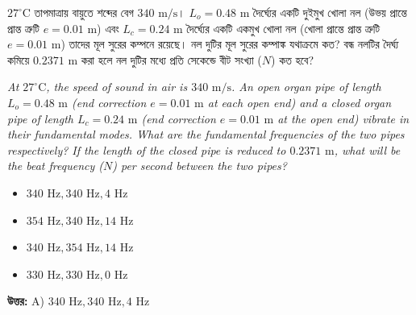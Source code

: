 \documentclass[12pt, a4paper]{article}
\begin{document}
\begin{tcolorbox}[questionbox={প্রশ্ন (Question) 23}]
    \noindent
    $27^\circ\text{C}$ তাপমাত্রায় বায়ুতে শব্দের বেগ $340\text{ m/s}$। $L_o = 0.48\text{ m}$ দৈর্ঘ্যের একটি দুইমুখ খোলা নল (উভয় প্রান্তে প্রান্ত ত্রুটি $e = 0.01\text{ m}$) এবং $L_c = 0.24\text{ m}$ দৈর্ঘ্যের একটি একমুখ খোলা নল (খোলা প্রান্তে প্রান্ত ত্রুটি $e = 0.01\text{ m}$) তাদের মূল সুরের কম্পনে রয়েছে। নল দুটির মূল সুরের কম্পাঙ্ক যথাক্রমে কত? বন্ধ নলটির দৈর্ঘ্য কমিয়ে $0.2371\text{ m}$ করা হলে নল দুটির মধ্যে প্রতি সেকেন্ডে বীট সংখ্যা ($N$) কত হবে?
    
    \vspace{0.8em}
    \begin{english}
    \noindent\textit{\color{darkgray}
    At $27^\circ\text{C}$, the speed of sound in air is $340\text{ m/s}$. An open organ pipe of length $L_o = 0.48\text{ m}$ (end correction $e = 0.01\text{ m}$ at each open end) and a closed organ pipe of length $L_c = 0.24\text{ m}$ (end correction $e = 0.01\text{ m}$ at the open end) vibrate in their fundamental modes. What are the fundamental frequencies of the two pipes respectively? If the length of the closed pipe is reduced to $0.2371\text{ m}$, what will be the beat frequency ($N$) per second between the two pipes?
    }
    \end{english}
\end{tcolorbox}

\begin{itemize}[label={}, leftmargin=1cm, itemsep=0.5em]
    \item[\textbf{A)}] $340\text{ Hz}, 340\text{ Hz}, 4\text{ Hz}$
    \item[\textbf{B)}] $354\text{ Hz}, 340\text{ Hz}, 14\text{ Hz}$
    \item[\textbf{C)}] $340\text{ Hz}, 354\text{ Hz}, 14\text{ Hz}$
    \item[\textbf{D)}] $330\text{ Hz}, 330\text{ Hz}, 0\text{ Hz}$
\end{itemize}

\vspace{0.5em}
\begin{tcolorbox}[answerbox]
    \textbf{\color{success} উত্তর:} A) $340\text{ Hz}, 340\text{ Hz}, 4\text{ Hz}$
\end{tcolorbox}
\vspace{1em}
\end{document}
